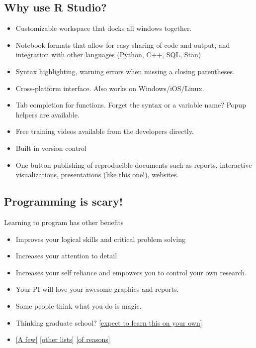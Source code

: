 \documentclass[]{article}
\providecommand{\tightlist}{%
  \setlength{\itemsep}{0pt}\setlength{\parskip}{0pt}}
\begin{document}
\hypertarget{why-use-r-studio}{%
\subsection{Why use R Studio?}\label{why-use-r-studio}}

\begin{itemize}
\tightlist
\item
  Customizable workspace that docks all windows together.
\item
  Notebook formats that allow for easy sharing of code and output, and
  integration with other languages (Python, C++, SQL, Stan)
\item
  Syntax highlighting, warning errors when missing a closing
  parentheses.
\item
  Cross-platform interface. Also works on Windows/iOS/Linux.
\item
  Tab completion for functions. Forget the syntax or a variable name?
  Popup helpers are available.
\item
  Free training videos available from the developers directly.
\item
  Built in version control
\item
  One button publishing of reproducible documents such as reports,
  interactive visualizations, presentations (like this one!), websites.
\end{itemize}

\hypertarget{programming-is-scary}{%
\subsection{Programming is scary!}\label{programming-is-scary}}

Learning to program has other benefits

\begin{itemize}
\tightlist
\item
  Improves your logical skills and critical problem solving
\item
  Increases your attention to detail
\item
  Increases your self reliance and empowers you to control your own
  research.
\item
  Your PI will love your awesome graphics and reports.
\item
  Some people think what you do is magic.
\item
  Thinking graduate school?
  \href{http://www.nature.com/nature/journal/v541/n7638/full/nj7638-563a.html}{{[}expect
  to learn this on your own{]}}
\item
  \href{https://skillcrush.com/2015/01/28/laurence-bradford-10-reasons/}{{[}A
  few{]}}
  \href{https://careerfoundry.com/en/blog/web-development/7-benefits-of-learning-to-code/}{{[}other
  lists{]}}
  \href{https://skillcrush.com/2017/01/30/learn-to-code-benefits/}{{[}of
  reasons{]}}
\end{itemize}
\end{document}
